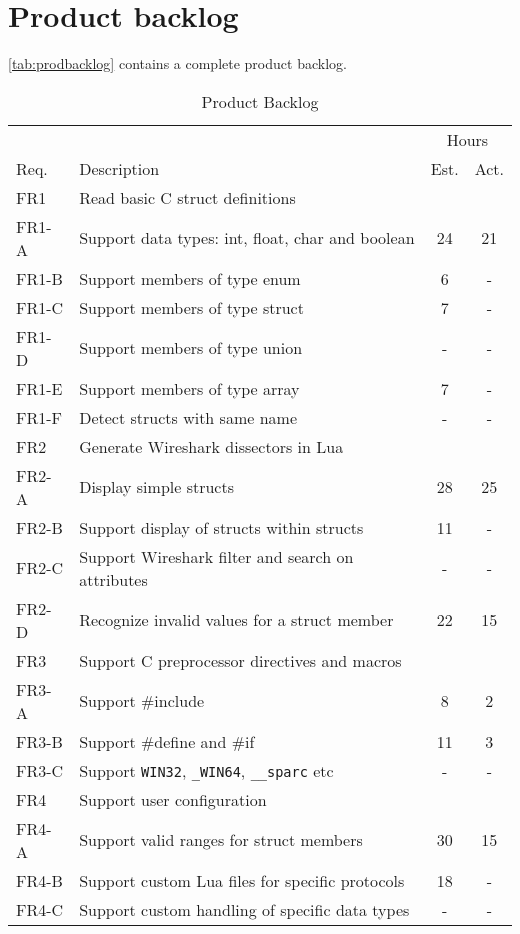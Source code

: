 \section{Product backlog}
\label{sec:prodbacklog}
\autoref{tab:prodbacklog} contains a complete product backlog.

\begin{table}[ht] \small \center
\caption{Product Backlog \label{tab:prodbacklog}}
\begin{tabularx}{\textwidth}{l X c c}
	\toprule
	& & \multicolumn{2}{c}{Hours} \\
	\cmidrule(r){3-4}
	Req. & Description & Est. & Act. \\
	\midrule
	FR1 & Read basic C struct definitions & & \\
	FR1-A & Support data types: int, float, char and boolean & 24 & 21 \\
	FR1-B & Support members of type enum & 6 & - \\
	FR1-C & Support members of type struct & 7 & - \\
	FR1-D & Support members of type union & - & - \\
	FR1-E & Support members of type array & 7 & - \\
	FR1-F & Detect structs with same name & - & - \\
	\addlinespace
	FR2 & Generate Wireshark dissectors in Lua & & \\
	FR2-A & Display simple structs & 28 & 25 \\
	FR2-B & Support display of structs within structs & 11 & - \\
	FR2-C & Support Wireshark filter and search on attributes & - & - \\
	FR2-D & Recognize invalid values for a struct member & 22 & 15 \\
	\addlinespace
	FR3 & Support C preprocessor directives and macros & & \\
	FR3-A & Support \#include & 8 & 2 \\
	FR3-B & Support \#define and \#if & 11 & 3 \\
	FR3-C & Support \verb+WIN32+, \verb+_WIN64+, \verb+__sparc+ etc & - & - \\
	\addlinespace
	FR4 & Support user configuration & & \\
	FR4-A & Support valid ranges for struct members & 30 & 15 \\
	FR4-B & Support custom Lua files for specific protocols & 18 & - \\
	FR4-C & Support custom handling of specific data types & - & - \\

\end{tabularx}
\end{table}
